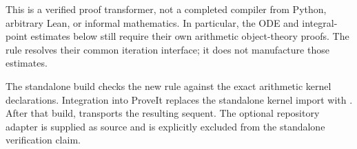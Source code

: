 This is a verified proof transformer, not a completed compiler from Python,
arbitrary Lean, or informal mathematics. In particular, the ODE and
integral-point estimates below still require their own arithmetic
object-theory proofs. The rule resolves their common iteration interface;
it does not manufacture those estimates.

The standalone build checks the new rule against the exact arithmetic
kernel declarations. Integration into ProveIt replaces the standalone
kernel import with . After that build,
 transports the resulting sequent. The optional
repository adapter is supplied as source and is explicitly excluded from
the standalone verification claim.
